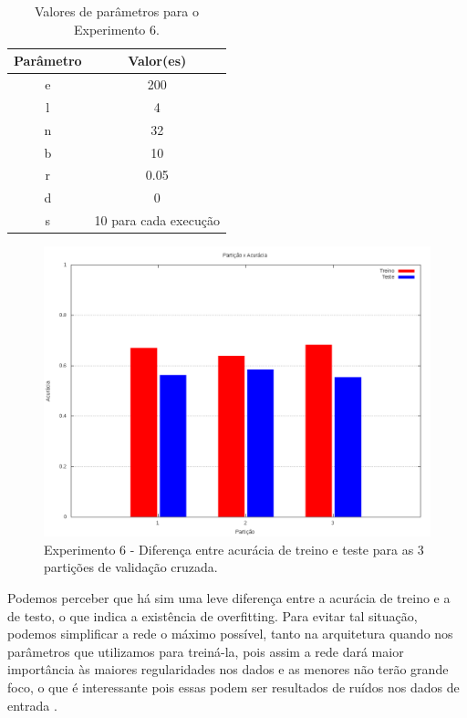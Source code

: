 \documentclass[12pt]{article}
\begin{document}
\begin{table}[h]
	\centering
	\begin{tabular}{|c|c|}
		\hline
		\textbf{Parâmetro} & \textbf{Valor(es)} \\ \hline
		e & 200 \\ \hline
		l & 4 \\ \hline
		n & 32 \\ \hline
		b & 10 \\ \hline
		r & 0.05 \\ \hline
		d & 0 \\ \hline
		s & 10 para cada execução \\ \hline
	\end{tabular}
	\caption{\label{tab:exp6} Valores de parâmetros para o Experimento
	6.}
\end{table}

\begin{figure}[h]
  \centering
  \includegraphics[width=1\textwidth]{../tests/6-overfit/graph.png}
  \caption{Experimento 6 - Diferença entre acurácia de treino e teste
  para as 3 partições de validação cruzada.}
  \label{fig:exp6}
\end{figure}

Podemos perceber que há sim uma leve diferença entre a acurácia de treino
e a de testo, o que indica a existência de overfitting. Para evitar tal situação,
podemos simplificar a rede o máximo possível, tanto na arquitetura quando nos 
parâmetros que utilizamos para treiná-la, pois assim a rede dará maior
importância às maiores regularidades nos dados e as menores não terão grande
foco, o que é interessante pois essas podem ser resultados de ruídos nos dados
de entrada \cite{Theodoridis:2008:PRF:1457541}.
\end{document}
